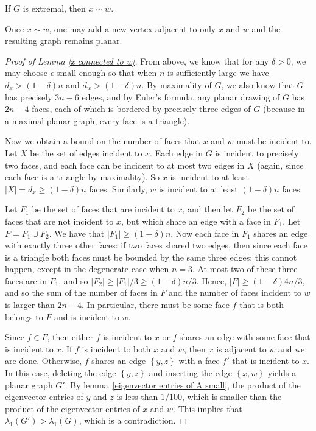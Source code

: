 \begin{lemma}\label{x connected to w}
If $G$ is extremal, then $x\sim w$.
\end{lemma}

Once $x\sim w$, one may add a new vertex adjacent to only $x$ and $w$ and the resulting graph remains planar.

\begin{proof}[Proof of Lemma \ref{x connected to w}]
From above, we know that for any $\delta > 0$, we may choose $\epsilon$ small enough so that when $n$ is sufficiently
large we have $d_x > (1-\delta)n$ and $d_w > (1-\delta)n$.  By maximality
of $G$, we also know that $G$ has precisely $3n-6$ edges, and by Euler's formula, any planar drawing of $G$ has $2n-4$ faces, each of which is bordered by precisely three edges of $G$ (because in a maximal planar graph, every face is a triangle).    


Now we obtain a bound on the number of faces that $x$ and $w$ must be incident to.  Let $X$ be the set of edges incident to $x$.  Each edge in $G$ is incident to precisely two faces, and each face can be incident to at most two edges in $X$ (again, since each face is a triangle by maximality).  So $x$ is incident to at least $|X| = d_x \geq (1-\delta)n$ faces.  Similarly, $w$ is incident to at least $(1-\delta)n$ faces. 


Let $F_1$ be the set of faces that are incident to $x$, and then let $F_2$ be the set of faces that are not incident to $x$, but which share an edge with a face in $F_1$.  Let $F = F_1 \cup F_2$.  We have that $|F_1| \geq (1-\delta)n$.  Now each
face in $F_1$ shares an edge with exactly three other faces:  if two faces shared two edges, then since each face is a triangle
both faces must be bounded by the same three edges;  this cannot happen, except in the degenerate case when $n=3$.  At most two of these three faces are in $F_1$, and so $|F_2| \geq |F_1| / 3 \geq (1-\delta)n / 3$.  Hence, $|F| \geq (1-\delta)4n / 3$, and so the sum of the number of faces
in $F$ and the number of faces incident to  $w$ is larger than $2n-4$.  In 
particular, there must be some face $f$ that is both belongs to $F$ and is incident to $w$.


Since $f \in F$, then either $f$ is incident to $x$ or $f$ shares an edge with some face that is incident to $x$.  If $f$ is incident to both $x$ and $w$, then $x$ is adjacent to $w$ and 
we are done.  Otherwise, $f$ shares an edge $\left\{y,z\right\}$ with a face $f'$ that is incident to $x$.  In this case, deleting the edge $\left\{y,z\right\}$ and inserting the edge $\left\{x,w\right\}$ yields a planar graph $G'$.  By lemma~\ref{eigenvector entries of A small}, 
the product of the eigenvector entries of $y$ and $z$ is less than $1/100$,
which is smaller than the product of the eigenvector entries of $x$ and $w$.  
This implies that $\lambda_1(G') > \lambda_1(G)$, which is a contradiction.
\end{proof}

